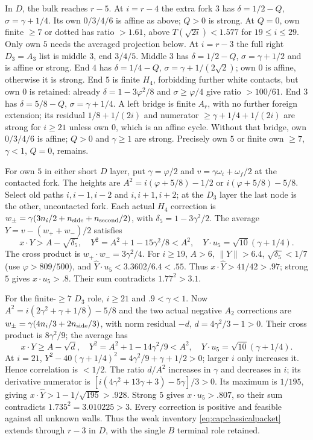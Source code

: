 \documentclass[11pt]{article}
\theoremstyle{remark}
\newcommand{\ph}{\varphi}
\begin{document}
In $D$, the bulk reaches $r-5$. At $i=r-4$ the extra fork $3$
has $\delta=1/2-Q$, $\sigma=\gamma+1/4$.
Its own $0/3/4/6$ is affine as above; $Q>0$ is strong.
At $Q=0$, own finite $\ge7$ or dotted has ratio $>1.61$,
above $T(\sqrt{2i})<1.577$ for $19\le i\le29$.
Only own $5$ needs the averaged projection below.
At $i=r-3$ the full right $D_3=A_3$ list is middle $3$, end $3/4/5$.
Middle $3$ has $\delta=1/2-Q$, $\sigma=\gamma+1/2$ and is
affine or strong. End $4$ has $\delta=1/4-Q$,
$\sigma=\gamma+1/(2\sqrt2)$; own $0$ is affine, otherwise it is
strong. End $5$ is finite $H_4$, forbidding further white contacts,
but own $0$ is retained: already
$\delta=1-3\ph^2/8$ and $\sigma\ge\ph/4$ give ratio $>100/61$.
End $3$ has $\delta=5/8-Q$, $\sigma=\gamma+1/4$.
A left bridge is finite $A_r$, with no further foreign extension;
its residual $1/8+1/(2i)$ and numerator
$\ge\gamma+1/4+1/(2i)$ are strong for $i\ge21$ unless own $0$,
which is an affine cycle. Without that bridge, own $0/3/4/6$ is
affine; $Q>0$ and $\gamma\ge1$ are strong. Precisely own $5$ or
finite own $\ge7$, $\gamma<1$, $Q=0$, remains.

For own $5$ in either short $D$ layer, put $\gamma=\ph/2$ and
$v=\gamma\omega_i+\omega_f/2$ at the contacted fork.
The heights are $A^2=i(\ph+5/8)-1/2$ or
$i(\ph+5/8)-5/8$. Select old paths $i,i-1,i-2$ and
$i,i+1,i+2$; at the $D_3$ layer the last node is the other,
uncontacted fork. Each actual $H_4$ correction is
$w_\pm=\gamma(3n_i/2+n_{\rm side}+n_{\rm second}/2)$,
with $\delta_5=1-3\gamma^2/2$.
The average $Y=v-(w_++w_-)/2$ satisfies
\[
 x\cdot Y>A-\sqrt{\delta_5},\quad
 Y^2=A^2+1-15\gamma^2/8<A^2,\quad
 Y\cdot u_5=\sqrt{10}(\gamma+1/4).
\]
The cross product is $w_+\cdot w_-=3\gamma^2/4$.
For $i\ge19$, $A>6$, $\|Y\|>6.4$,
$\sqrt{\delta_5}<1/7$ (use $\ph>809/500$), and
$\widehat Y\cdot u_5<3.3602/6.4<.55$.
Thus $x\cdot\widehat Y>41/42>.97$; strong $5$ gives
$x\cdot u_5>.8$. Their sum contradicts $1.77^2>3.1$.

For the finite-$\ge7$ $D_3$ role, $i\ge21$ and
$.9<\gamma<1$. Now
$A^2=i(2\gamma^2+\gamma+1/8)-5/8$ and the two actual negative
$A_2$ corrections are $w_\pm=\gamma(4n_i/3+2n_{\rm side}/3)$,
with norm residual $-d$, $d=4\gamma^2/3-1>0$.
Their cross product is $8\gamma^2/9$; the average has
\[
 x\cdot Y\ge A-\sqrt d,\quad
 Y^2=A^2+1-14\gamma^2/9<A^2,
 \quad Y\cdot u_5=\sqrt{10}(\gamma+1/4).
\]
At $i=21$,
$Y^2-40(\gamma+1/4)^2=4\gamma^2/9+\gamma+1/2>0$;
larger $i$ only increases it. Hence correlation is $<1/2$.
The ratio $d/A^2$ increases in $\gamma$ and decreases in $i$;
its derivative numerator is
$[i(4\gamma^2+13\gamma+3)-5\gamma]/3>0$.
Its maximum is $1/195$, giving
$x\cdot\widehat Y>1-1/\sqrt{195}>.928$.
Strong $5$ gives $x\cdot u_5>.807$, so their sum contradicts
$1.735^2=3.010225>3$.
Every correction is positive and feasible against all unknown walls.
Thus the weak inventory \eqref{eq:capclassicalpacket} extends
through $r-3$ in $D$, with the single $B$ terminal role retained.
\end{document}
